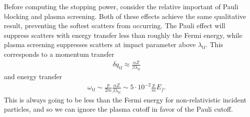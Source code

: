 \documentclass[twocolumn,preprintnumbers,amsmath,amssymb,prl, superscriptaddress]{revtex4}
\begin{document}
\begin{appendices}
Before computing the stopping power, consider the relative important of Pauli blocking and plasma screening.
Both of these effects achieve the same qualitative result, preventing the softest scatters from occurring.
The Pauli effect will suppress scatters with energy transfer less than roughly the Fermi energy, while plasma screening suppresses scatters at impact parameter above $\lambda_\text{tf}$.
This corresponds to a momentum transfer
\begin{align}
      \delta q_\text{tf} \approx \frac{\alpha Z}{\beta \lambda_\text{tf}}
\end{align}
and energy transfer
\begin{align}
  \label{eq:cuttoff_compare}
  \omega_\text{tf} \sim \frac{p}{2m} \frac{\alpha Z}{\beta \lambda_\text{tf}}
         \sim 5 \cdot 10^{-2} \frac{p}{m} E_f.
\end{align}
This is always going to be less than the Fermi energy for non-relativistic incident particles, and so we can ignore the plasma cutoff in favor of the Pauli cutoff.


\end{appendices}
\end{document}
